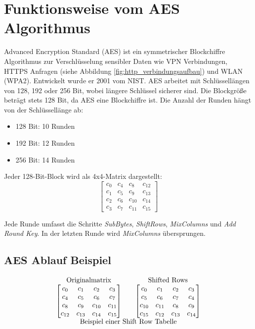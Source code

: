 \section{Funktionsweise vom AES Algorithmus}
\label{sec:aes}
\setlength{\parindent}{0pt}

Advanced Encryption Standard (AES) ist ein symmetrischer Blockchiffre Algorithmus zur 
Verschlüsselung sensibler Daten wie VPN Verbindungen, HTTPS Anfragen 
(siehe Abbildung \ref{fig:http_verbindungsaufbau}) und WLAN (WPA2). 
Entwickelt wurde er 2001 vom NIST. AES arbeitet mit Schlüssellängen von 128, 192 oder 256 Bit, 
wobei längere Schlüssel sicherer sind. Die Blockgröße beträgt stets 128 Bit, da AES eine Blockchiffre 
ist. Die Anzahl der Runden hängt von der Schlüssellänge ab: 
\begin{itemize}
    \item 128 Bit: 10 Runden
    \item 192 Bit: 12 Runden
    \item 256 Bit: 14 Runden
\end{itemize}

Jeder 128-Bit-Block wird als 4x4-Matrix dargestellt:
\[
\begin{bmatrix}
c_0  & c_4  & c_8  & c_{12} \\
c_1  & c_5  & c_9  & c_{13} \\
c_2  & c_6  & c_{10} & c_{14} \\
c_3  & c_7  & c_{11} & c_{15}
\end{bmatrix}
\]

Jede Runde umfasst die Schritte \textit{SubBytes}, \textit{ShiftRows}, \textit{MixColumns} und \textit{Add Round Key}. In der letzten Runde wird \textit{MixColumns} über\-sprungen.\cite{AES_Algorithmus_2}\cite{AES_Algorithmus_3}\cite{AES_Algorithmus}\cite{Blockchiffre}

\subsection{AES Ablauf Beispiel}
\[
\begin{array}{c}
\begin{array}{c@{\quad\quad}c}
\text{Originalmatrix} & \text{Shifted Rows} \\
\begin{bmatrix}
c_0  & c_1  & c_2  & c_3  \\
c_4  & c_5  & c_6  & c_7  \\
c_8  & c_9  & c_{10} & c_{11} \\
c_{12} & c_{13} & c_{14} & c_{15}
\end{bmatrix}
&
\begin{bmatrix}
c_0  & c_1  & c_2  & c_3  \\
c_5  & c_6  & c_7  & c_4  \\
c_{10} & c_{11} & c_8  & c_9  \\
c_{15} & c_{12} & c_{13} & c_{14}
\end{bmatrix}
\end{array} \\
\text{Beispiel einer Shift Row Tabelle}
\end{array}
\]



